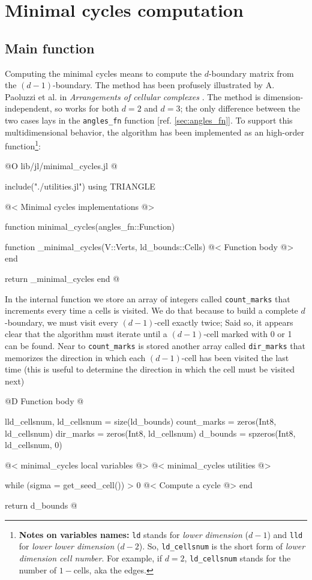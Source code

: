 \chapter{Minimal cycles computation}
\label{ch:minimal_cycles}

\section{Main function}


Computing the minimal cycles means to compute the $d$-boundary matrix
from the $(d-1)$-boundary. The method has been profusely illustrated
by A. Paoluzzi et al. in \textit{Arrangements of cellular complexes}
\cite{Paoluzzi}.
The method is dimension-independent, so works for both $d=2$ and $d=3$;
the only difference between the two cases lays in the \texttt{angles\_fn}
function [ref. \ref{sec:angles_fn}]. To support this multidimensional
behavior, the algorithm has been implemented as an high-order function\footnote{
    \textbf{Notes on variables names:} \texttt{ld} stands for \textit{lower dimension} ($d-1$)
    and \texttt{lld} for \textit{lower lower dimension} ($d-2$). So, \texttt{ld\_cellsnum} is the
    short form of \textit{lower dimension cell number}. For example, if $d=2$, \texttt{ld\_cellsnum} stands for the
    number of $1-$cells, aka the edges.
}:

@O lib/jl/minimal_cycles.jl
@{include("./utilities.jl")
using TRIANGLE

@< Minimal cycles implementations @>

function minimal_cycles(angles_fn::Function)

    function _minimal_cycles(V::Verts, ld_bounds::Cells)
        @< Function body @>
    end

    return _minimal_cycles
end
@}

In the internal function we store an array of integers called \texttt{count\_marks} 
that increments every time a cells is visited. We do that because to build 
a complete $d$-boundary, we must visit every $(d-1)$-cell exactly twice;
Said so, it appears clear that the algorithm must iterate until a $(d-1)$-cell 
marked with 0 or 1 can be found. Near to \texttt{count\_marks} is stored another
array called \texttt{dir\_marks} that memorizes the direction in which each $(d-1)$-cell
has been visited the last time (this is useful to determine the direction in which the cell
must be visited next)

@D Function body
@{lld_cellsnum, ld_cellsnum = size(ld_bounds)
count_marks = zeros(Int8, ld_cellsnum)
dir_marks = zeros(Int8, ld_cellsnum)
d_bounds = spzeros(Int8, ld_cellsnum, 0)

@< minimal\_cycles local variables @>
@< minimal\_cycles utilities @>

while (sigma = get_seed_cell()) > 0
    @< Compute a cycle @>
end

return d_bounds
@}

